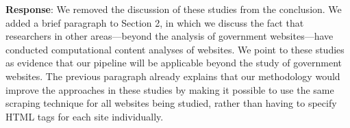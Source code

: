 \documentclass[12pt,titlepage]{article}
\begin{document}
\begin{enumerate}
	\textbf{Response}:  We removed the discussion of these studies from the conclusion. We added a brief paragraph to Section 2, in which we discuss the fact that researchers in other areas---beyond the analysis of government websites---have conducted computational content analyses of websites. We point to these studies as evidence that our pipeline will be applicable beyond the study of government websites. The previous paragraph already explains that our methodology would improve the approaches in these studies by making it possible to use the same scraping technique for all websites being studied, rather than having to specify HTML tags for each site individually.



\end{enumerate}



%
% 
\end{document}
